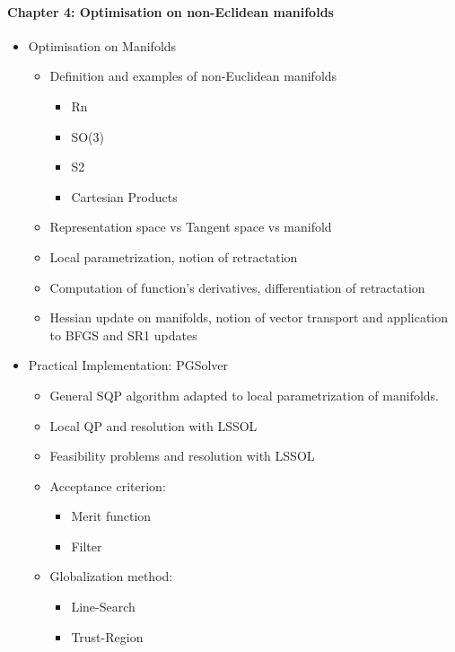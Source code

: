 \documentclass{article}
\begin{document}

\paragraph {Chapter 4: Optimisation on non-Eclidean manifolds }
\begin{itemize}
  \item{Optimisation on Manifolds}
    \begin{itemize}
      \item Definition and examples of non-Euclidean manifolds
        \begin{itemize}
          \item Rn
          \item SO(3)
          \item S2
          \item Cartesian Products
        \end{itemize}
      \item Representation space vs Tangent space vs manifold
      \item Local parametrization, notion of retractation
      \item Computation of function's derivatives, differentiation of retractation
      \item Hessian update on manifolds, notion of vector transport and application to BFGS and SR1 updates
    \end{itemize}
  \item{Practical Implementation: PGSolver}
    \begin{itemize}
      \item General SQP algorithm adapted to local parametrization of manifolds.
      \item Local QP and resolution with LSSOL
      \item Feasibility problems and resolution with LSSOL
      \item Acceptance criterion:
        \begin{itemize}
          \item Merit function
          \item Filter
        \end{itemize}
      \item Globalization method:
        \begin{itemize}
          \item Line-Search
          \item Trust-Region
            \begin{itemize}

\end{itemize}
\end{itemize}
\end{itemize}
\end{itemize}
\end{document}
